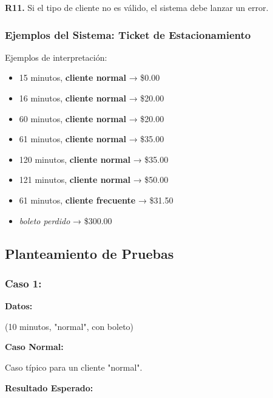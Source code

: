 \documentclass[11pt,letterpaper]{article}
\begin{document}
\textbf{R11.} Si el tipo de cliente no es válido, el sistema debe lanzar un error.

\vspace{\baselineskip}
\vspace{\baselineskip}
\vspace{\baselineskip}
\vspace{\baselineskip}
\vspace{\baselineskip}

\subsubsection{Ejemplos del Sistema: Ticket de Estacionamiento}
\label{sec:org837c0e6}

Ejemplos de interpretación:

\begin{itemize}
\item 15 minutos, \textbf{cliente normal} → \$0.00
\item 16 minutos, \textbf{cliente normal} → \$20.00
\item 60 minutos, \textbf{cliente normal} → \$20.00
\item 61 minutos, \textbf{cliente normal} → \$35.00
\item 120 minutos, \textbf{cliente normal} → \$35.00
\item 121 minutos, \textbf{cliente normal} → \$50.00
\item 61 minutos, \textbf{cliente frecuente} → \$31.50
\item \emph{boleto perdido} → \$300.00
\end{itemize}


\subsection{Planteamiento de Pruebas}
\label{sec:org7223c3c}


\subsubsection{Caso 1:}
\label{sec:orgcb7573a}

\textbf{Datos:}

(10 minutos, "normal", con boleto)

\textbf{Caso Normal:}

Caso típico para un cliente "normal".

\textbf{Resultado Esperado:}
\end{document}
